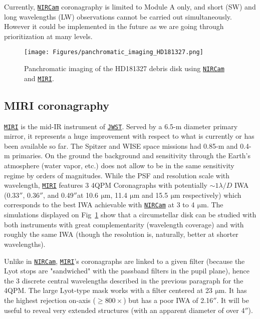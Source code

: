 \documentclass[]{spie}  %
\newcommand{\todo}[1]{\textcolor{red}{[#1]}}
\newcommand{\arcsec}{\mbox{$''$}}
\newcommand{\micron}{$\SI{}{\, \micro\meter}$\xspace}
\newcommand{\jwst}{{\tt \href{https://jwst.stsci.edu}{JWST}}\xspace}
\newcommand{\nircam}{{\tt \href{https://jwst.stsci.edu/instrumentation/nircam}{NIRCam}}\xspace}
\newcommand{\miri}{{\tt \href{https://jwst.stsci.edu/instrumentation/miri}{MIRI}}\xspace}
\begin{document}
Currently, \nircam coronagraphy is limited to Module A only, and short (SW) and long wavelengths (LW) observations cannot be carried out simultaneously. However it could be implemented in the future as we are going through prioritization at many levels.

\begin{figure}[h!]
\begin{center}
\texttt{[image: Figures/panchromatic\_imaging\_HD181327.png]}
\caption{Panchromatic imaging of the HD181327 debris disk using \nircam and \miri.}
\label{fig:jwst-disk}
\end{center}
\end{figure}

\subsection{MIRI coronagraphy}
\label{sec:MIRI}

\miri is the mid-IR instrument of \jwst. Served by a 6.5-m diameter primary mirror, it represents a huge improvement with respect to what is currently or has been available so far. The Spitzer and WISE space missions had 0.85-m and 0.4-m primaries. On the ground the background and sensitivity through the Earth's atmosphere (water vapor, etc.) does not allow to be in the same sensitivity regime by orders of magnitudes.  While the PSF and resolution scale with wavelength, \miri features 3 4QPM Coronagraphs\cite{rouan2000} with potentially $\sim 1 \lambda/D$ IWA (0.33\arcsec, 0.36\arcsec, and 0.49\arcsec at 10.6\micron,  11.4\micron and 15.5\micron respectively) which corresponds to the best IWA achievable with \nircam at 3 to 4\micron. The simulations displayed on Fig~\ref{fig:jwst-disk} show that a circumstellar disk can be  studied with both instruments with great complementarity (wavelength coverage) and with roughly the same IWA (though the resolution is, naturally, better at shorter wavelengths). 

Unlike in \nircam, \miri's coronagraphs are linked to a given filter (because the Lyot stops are "sandwiched" with the passband filters in the pupil plane), hence the 3 discrete central wavelengths described in the previous paragraph for the 4QPM. The large Lyot-type mask works with a filter centered at 23\micron. It has the highest rejection on-axis ($\geqslant 800\times$) but has a poor IWA of 2.16\arcsec. It will be useful to reveal very extended structures (with an apparent diameter of over 4\arcsec).
\end{document}
